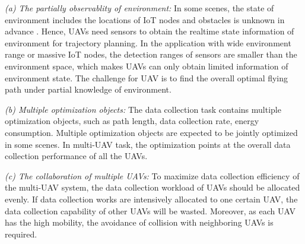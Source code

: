 \documentclass[journal]{IEEEtran}
\begin{document}
\textit{(a) The partially observablity of environment:} In some scenes, the state of environment includes the locations of IoT nodes and obstacles is unknown in advance \cite{RLu23}. Hence, UAVs need sensors to obtain the realtime state information of environment for trajectory planning. In the application with wide environment range or massive IoT nodes, the detection ranges of sensors are smaller than the environment space, which makes UAVs can only obtain limited information of environment state. The challenge for UAV is to find the overall optimal flying path under partial knowledge of environment. 

\textit{(b) Multiple optimization objects:} The data collection task contains multiple optimization objects, such as path length, data collection rate, energy consumption. Multiple optimization objects are expected to be jointly optimized in some scenes. In multi-UAV task, the optimization points at the overall data collection performance of all the UAVs. 

\textit{(c) The collaboration of multiple UAVs:} To maximize data collection efficiency of the multi-UAV system, the data collection workload of UAVs should be allocated evenly. If data collection works are intensively allocated to one certain UAV, the data collection capability of other UAVs will be wasted. Moreover, as each UAV has the high mobility, the avoidance of collision with neighboring UAVs is required. 
\end{document}
